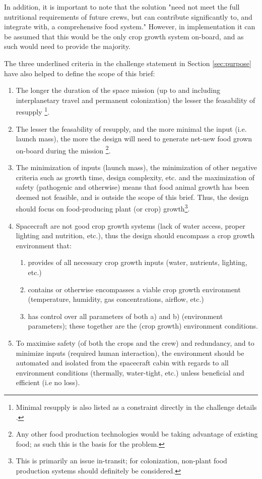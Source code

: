\documentclass{report}
\begin{document}
In addition, it is important to note that the solution "need not meet the full nutritional requirements of 
future crews, but can contribute significantly to, and integrate with, a comprehensive food system." \cite{applicantguide} 
However, in implementation it can be assumed that this would be the only crop growth system on-board, and as such would
need to provide the majority.

The three underlined criteria in the challenge statement in Section \ref{sec:purpose} have also helped to define the 
scope of this brief:

\begin{enumerate}
\item The longer the duration of the space mission (up to and including interplanetary 
    travel and permanent colonization) the lesser the feasability of resupply
    \footnote{Minimal resupply is also listed as a constraint directly in the challenge 
    details \cite{applicantguide}.}.
\item The lesser the feasability of resupply, and the more minimal the input 
    (i.e. launch mass), the more the design will need to generate net-new food 
    grown on-board during the mission \footnote{Any other food production technologies 
    would be taking advantage of existing food; as such this is the basis for the 
    problem.}.
\item The minimization of inputs (launch mass), the minimization of other negative 
    criteria such as growth time, design complexity, etc. and the maximization of 
    safety (pathogenic and otherwise) means that food animal growth has been deemed 
    not feasible, and is outside the scope of this brief. Thus, the design should 
    focus on food-producing plant (or crop) growth\footnote{This is primarily an 
    issue in-transit; for colonization, non-plant food production systems should 
    definitely be considered.}.
\item Spacecraft are not good crop growth systems (lack of water access, proper 
    lighting and nutrition, etc.), thus the design should encompass a crop growth 
    environment that:
    \begin{enumerate}
        \item provides of all necessary crop growth inputs (water, nutrients, lighting, 
        etc.)
        \item contains or otherwise encompasses a viable crop growth environment 
        (temperature, humidity, gas concentrations, airflow, etc.)
        \item has control over all parameters of both a) and b) (environment parameters); 
        these together are the (crop growth) environment conditions.
    \end{enumerate}
\item To maximise safety (of both the crops and the crew) and redundancy, and to minimize 
    inputs (required human interaction), the environment should be automated and isolated 
    from the spacecraft cabin with regards to all environment conditions (thermally, 
    water-tight, etc.) unless beneficial and efficient (i.e no loss).


\end{enumerate}
\end{document}
